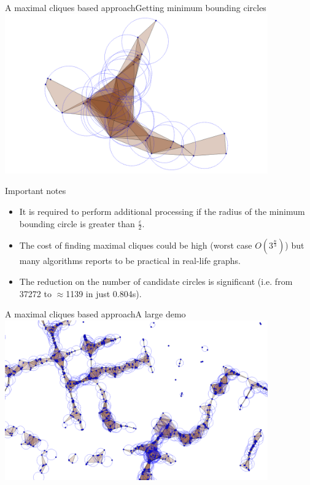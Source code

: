 \documentclass{beamer}
\begin{document}
\begin{frame}{A maximal cliques based approach}{Getting minimum bounding circles}
    \centering
    \includegraphics[width=0.85\textwidth]{figures/demo4}
\end{frame}

\begin{frame}{Important notes}
    \begin{itemize}
        \item It is required to perform additional processing if the radius of the minimum bounding circle is greater than $\frac{\varepsilon}{2}$.  
        \item The cost of finding maximal cliques could be high (worst case $O(3^{\frac{n}{3}})$) but many algorithms reports to be practical in real-life graphs.
        \item The reduction on the number of candidate circles is significant (i.e. from 37272 to $\approx$1139 in just 0.804s). 
    \end{itemize}
\end{frame}

\begin{frame}{A maximal cliques based approach}{A large demo}
    \centering
    \includegraphics[width=0.85\textwidth]{figures/demo5}
\end{frame}
\end{document}

